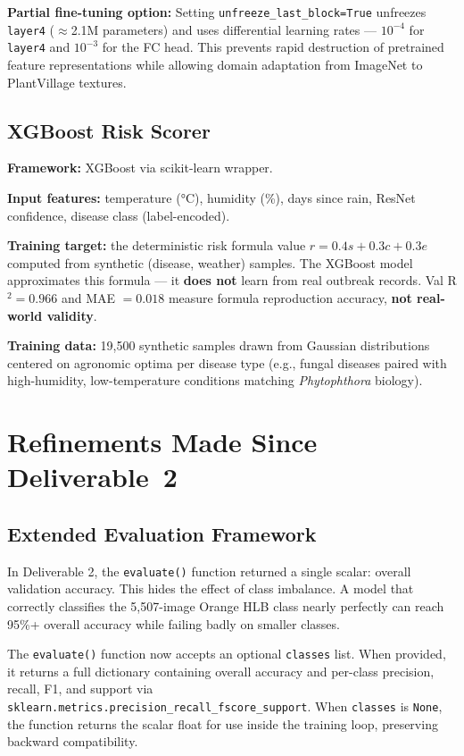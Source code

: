\documentclass[conference]{IEEEtran}
\let\oldtexttt\texttt
\renewcommand{\texttt}[1]{{\small\oldtexttt{#1}}}
\begin{document}
\textbf{Partial fine-tuning option:} Setting \texttt{unfreeze\_last\_block=True} unfreezes \texttt{layer4} ($\approx$2.1M parameters) and uses differential learning rates --- $10^{-4}$ for \texttt{layer4} and $10^{-3}$ for the FC head. This prevents rapid destruction of pretrained feature representations while allowing domain adaptation from ImageNet to PlantVillage textures.

\subsection{XGBoost Risk Scorer}

\textbf{Framework:} XGBoost via scikit-learn wrapper.

\textbf{Input features:} temperature (°C), humidity (\%), days since rain, ResNet confidence, disease class (label-encoded).

\textbf{Training target:} the deterministic risk formula value $r = 0.4s + 0.3c + 0.3e$ computed from synthetic (disease, weather) samples. The XGBoost model approximates this formula --- it \textbf{does not} learn from real outbreak records. Val R$^2 = 0.966$ and MAE $= 0.018$ measure formula reproduction accuracy, \textbf{not real-world validity}.

\textbf{Training data:} 19,500 synthetic samples drawn from Gaussian distributions centered on agronomic optima per disease type (e.g., fungal diseases paired with high-humidity, low-temperature conditions matching \textit{Phytophthora} biology).

\section{Refinements Made Since Deliverable~2}

\subsection{Extended Evaluation Framework}

In Deliverable 2, the \texttt{evaluate()} function returned a single scalar: overall validation accuracy. This hides the effect of class imbalance. A model that correctly classifies the 5,507-image Orange HLB class nearly perfectly can reach 95\%+ overall accuracy while failing badly on smaller classes.

The \texttt{evaluate()} function now accepts an optional \texttt{classes} list. When provided, it returns a full dictionary containing overall accuracy and per-class precision, recall, F1, and support via \texttt{sklearn.metrics.precision\_recall\_fscore\_support}. When \texttt{classes} is \texttt{None}, the function returns the scalar float for use inside the training loop, preserving backward compatibility.
\end{document}
